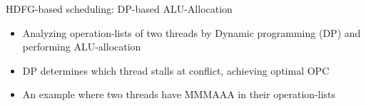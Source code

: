 \documentclass{beamer}
\begin{document}
\begin{CJK}{UTF8}{bkai}
            \begin{frame}{HDFG-based scheduling: DP-based ALU-Allocation}
                    \setcounter{subfigure}{0}
                    \begin{figure}[!ht]
                        \begin{center}
                            \hfill
                            \hfill
                        \end{center}
                        \label{fig:alloc}
                    \end{figure}
                \begin{itemize}
                    \item <2-> {Analyzing operation-lists of two threads by Dynamic programming (DP) and performing ALU-allocation}
                    \item <3-> {DP determines which thread stalls at conflict, achieving optimal OPC}
                    \item <4-> {An example where two threads have MMMAAA in their operation-lists}
                \end{itemize}
            \end{frame}


\end{CJK}
\end{document}
